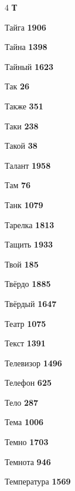 \begin{multicols}{4}
\vspace{0.6em}\noindent\textbf{\normalsize\sffamily\color{primary} Т}\par\vspace{0.2em}
\noindent Тайга \dotfill \textbf{\color{secondary} 1906}\par
\noindent Тайна \dotfill \textbf{\color{secondary} 1398}\par
\noindent Тайный \dotfill \textbf{\color{secondary} 1623}\par
\noindent Так \dotfill \textbf{\color{secondary} 26}\par
\noindent Также \dotfill \textbf{\color{secondary} 351}\par
\noindent Таки \dotfill \textbf{\color{secondary} 238}\par
\noindent Такой \dotfill \textbf{\color{secondary} 38}\par
\noindent Талант \dotfill \textbf{\color{secondary} 1958}\par
\noindent Там \dotfill \textbf{\color{secondary} 76}\par
\noindent Танк \dotfill \textbf{\color{secondary} 1079}\par
\noindent Тарелка \dotfill \textbf{\color{secondary} 1813}\par
\noindent Тащить \dotfill \textbf{\color{secondary} 1933}\par
\noindent Твой \dotfill \textbf{\color{secondary} 185}\par
\noindent Твёрдо \dotfill \textbf{\color{secondary} 1885}\par
\noindent Твёрдый \dotfill \textbf{\color{secondary} 1647}\par
\noindent Театр \dotfill \textbf{\color{secondary} 1075}\par
\noindent Текст \dotfill \textbf{\color{secondary} 1391}\par
\noindent Телевизор \dotfill \textbf{\color{secondary} 1496}\par
\noindent Телефон \dotfill \textbf{\color{secondary} 625}\par
\noindent Тело \dotfill \textbf{\color{secondary} 287}\par
\noindent Тема \dotfill \textbf{\color{secondary} 1006}\par
\noindent Темно \dotfill \textbf{\color{secondary} 1703}\par
\noindent Темнота \dotfill \textbf{\color{secondary} 946}\par
\noindent Температура \dotfill \textbf{\color{secondary} 1569}\par

\end{multicols}
